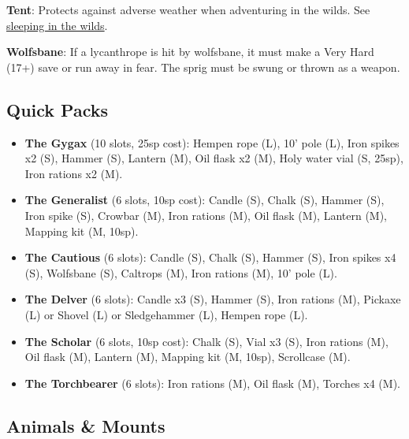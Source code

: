 \documentclass{article}
\begin{document}
\begin{multicols}{2}
\textbf{Tent}: Protects against adverse weather when adventuring in the
wilds. See \hyperref[sleeping-in-the-wilds]{sleeping in the wilds}.

\textbf{Wolfsbane}: If a lycanthrope is hit by wolfsbane, it must make a
Very Hard (17+) save or run away in fear. The sprig must be swung or
thrown as a weapon.

\subsection{Quick Packs}\label{quick-packs}

\begin{itemize}
\tightlist
\item
  \textbf{The Gygax} (10 slots, 25sp cost): Hempen rope (L), 10' pole
  (L), Iron spikes x2 (S), Hammer (S), Lantern (M), Oil flask x2 (M),
  Holy water vial (S, 25sp), Iron rations x2 (M).
\item
  \textbf{The Generalist} (6 slots, 10sp cost): Candle (S), Chalk (S),
  Hammer (S), Iron spike (S), Crowbar (M), Iron rations (M), Oil flask
  (M), Lantern (M), Mapping kit (M, 10sp).
\item
  \textbf{The Cautious} (6 slots): Candle (S), Chalk (S), Hammer (S),
  Iron spikes x4 (S), Wolfsbane (S), Caltrops (M), Iron rations (M), 10'
  pole (L).
\item
  \textbf{The Delver} (6 slots): Candle x3 (S), Hammer (S), Iron rations
  (M), Pickaxe (L) or Shovel (L) or Sledgehammer (L), Hempen rope (L).
\item
  \textbf{The Scholar} (6 slots, 10sp cost): Chalk (S), Vial x3 (S),
  Iron rations (M), Oil flask (M), Lantern (M), Mapping kit (M, 10sp),
  Scrollcase (M).
\item
  \textbf{The Torchbearer} (6 slots): Iron rations (M), Oil flask (M),
  Torches x4 (M).
\end{itemize}

\subsection{Animals \& Mounts}\label{animals-mounts}


\end{multicols}
\end{document}
